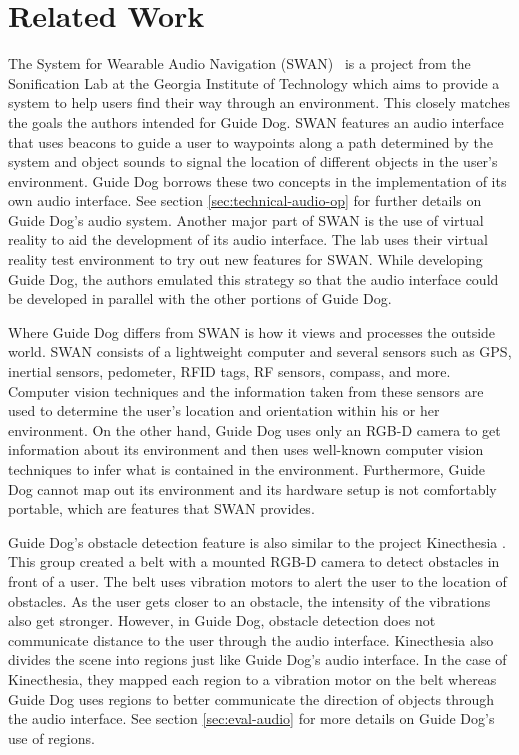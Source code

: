 \section{Related Work}
\label{sec:related}


The System for Wearable Audio Navigation (SWAN)~\cite{Walker04auditorynavigation} is a project
from the Sonification Lab at the Georgia Institute of Technology which aims to
provide a system to help users find their way through an environment. This
closely matches the goals the authors intended for Guide Dog. SWAN features an
audio interface that uses beacons to guide a user to waypoints along a path
determined by the system and object sounds to signal the location of different
objects in the user's environment. Guide Dog borrows these two concepts in the
implementation of its own audio interface. See section
\ref{sec:technical-audio-op} for further details on Guide Dog's audio system.
Another major part of SWAN is the use of virtual reality to aid the development
of its audio interface. The lab uses their virtual reality test environment to
try out new features for SWAN. While developing Guide Dog, the authors emulated
this strategy so that the audio interface could be developed in parallel with
the other portions of Guide Dog.

Where Guide Dog differs from SWAN is how it views and processes the outside
world. SWAN consists of a lightweight computer and several sensors such as GPS,
inertial sensors, pedometer, RFID tags, RF sensors, compass, and more.
Computer vision techniques and the information taken from these sensors are used to
determine the user's location and orientation within his or her environment. On
the other hand, Guide Dog uses only an RGB-D camera to get information about its
environment and then uses well-known computer vision techniques to infer what is
contained in the environment. Furthermore, Guide Dog cannot map out its
environment and its hardware setup is not comfortably portable, which are
features that SWAN provides.

Guide Dog's obstacle detection feature is also similar to the project Kinecthesia
\cite{kinecthesia-website}. This group created a belt with a mounted RGB-D
camera to detect obstacles in front of a user. The belt uses vibration
motors to alert the user to the location of obstacles. As the user gets closer
to an obstacle, the intensity of the vibrations also get stronger. However, in
Guide Dog, obstacle detection does not communicate distance to the user through
the audio interface. Kinecthesia also divides the
scene into regions just like Guide Dog's audio interface. In the case of
Kinecthesia, they mapped each region to a vibration motor on the belt whereas
Guide Dog uses regions to better communicate the direction of objects through
the audio interface. See section \ref{sec:eval-audio} for more details on Guide
Dog's use of regions.

